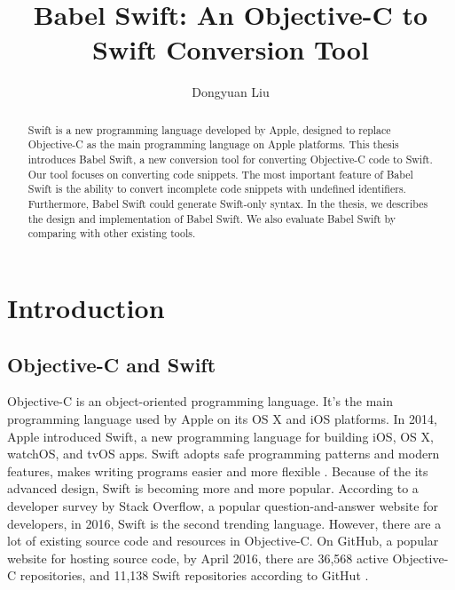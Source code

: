 \documentclass{sfuthesis}
\title{Babel Swift: An Objective-C to Swift Conversion Tool}
\author{Dongyuan Liu}
\begin{document}
\frontmatter
\maketitle{}
\makecommittee{}

\begin{abstract}
Swift is a new programming language developed by Apple, designed to replace Objective-C as the main programming language on Apple platforms. This thesis introduces Babel Swift, a new conversion tool for converting Objective-C code to Swift. Our tool focuses on converting code snippets. The most important feature of Babel Swift is the ability to convert incomplete code snippets with undefined identifiers. Furthermore, Babel Swift could generate Swift-only syntax. In the thesis, we describes the design and implementation of Babel Swift. We also evaluate Babel Swift by comparing with other existing tools.
\end{abstract}


\begin{dedication} %
\end{dedication}


\begin{acknowledgements} %
\end{acknowledgements}

\tableofcontents\clearpage
{}\listoftables\clearpage
{}\listoffigures\clearpage
{}\listoflistings





%
%

\mainmatter%

\chapter{Introduction}

\section{Objective-C and Swift}

Objective-C is an object-oriented programming language. It's the main programming language used by Apple on its OS X and iOS platforms. In 2014, Apple introduced Swift, a new programming language for building iOS, OS X, watchOS, and tvOS apps. Swift adopts safe programming patterns and modern features, makes writing programs easier and more flexible \cite{aboutswift}. Because of the its advanced design, Swift is becoming more and more popular. According to a developer survey by Stack Overflow, a popular question-and-answer website for developers, in 2016, Swift is the second trending language. However, there are a lot of existing source code and resources in Objective-C. On GitHub, a popular website for hosting source code, by April 2016, there are 36,568 active Objective-C repositories, and 11,138 Swift repositories according to GitHut \cite{githut}.
\end{document}
